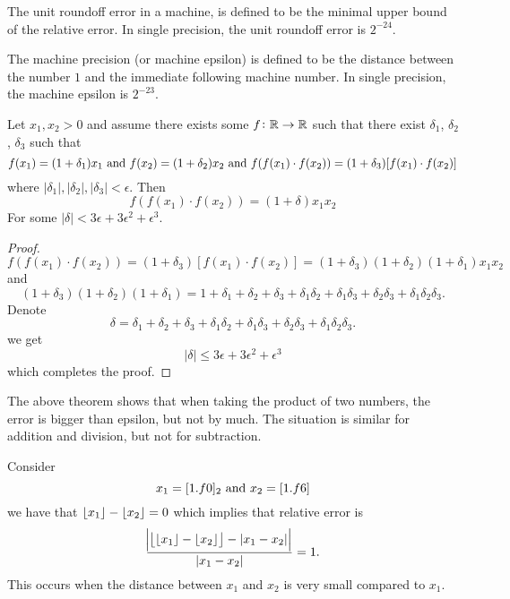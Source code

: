 \documentclass[11pt,a4paper]{article}
\begin{document}
\begin{definition}
  The unit roundoff error in a machine, is defined to be the minimal upper bound
  of the relative error.
  In single precision, the unit roundoff error is $2^{-24}$.
\end{definition}

\begin{definition}
  The machine precision (or machine epsilon) is defined to be the distance
  between the number $1$ and the immediate following machine number.
  In single precision, the machine epsilon is $2^{-23}$.
\end{definition}

\begin{proposition}
  Let $x_1,x_2 > 0$ and assume there exists some $f \colon \mathbb{R} \to \mathbb{R}$ such that
  there exist $\delta_1$, $\delta_2$, $\delta_3$ such that
  \[
    f(x_1) = (1 + \delta_1) x_1 \text{ and }
    f(x_2) = (1 + \delta_2) x_2 \text{ and }
    f(f(x_1) \cdot f(x_2)) = (1 + \delta_3)[f(x_1) \cdot f(x_2)]
  \]
  where $|\delta_1|, |\delta_2|, |\delta_3| < \epsilon$.
  Then
  \[
    f(f(x_1) \cdot f(x_2)) =
    (1 + \delta) x_1 x_2
  \]
  For some $|\delta| < 3 \epsilon + 3 \epsilon^2 + \epsilon^3$.
\end{proposition}
\begin{proof}
  \[
    f(f(x_1) \cdot f(x_2)) =
    (1 + \delta_3)[f(x_1) \cdot f(x_2)] =
    (1 + \delta_3)(1 + \delta_2)(1 + \delta_1) x_1 x_2
  \]
  and
  \[
    (1 + \delta_3)(1 + \delta_2)(1 + \delta_1) =
    1 + \delta_1 + \delta_2 + \delta_3 + 
    \delta_1 \delta_2 + \delta_1 \delta_3 + \delta_2 \delta_3 + 
    \delta_1 \delta_2 \delta_3.
  \]
  Denote
  \[
    \delta =
    \delta_1 + \delta_2 + \delta_3 + 
    \delta_1 \delta_2 + \delta_1 \delta_3 + \delta_2 \delta_3 + 
    \delta_1 \delta_2 \delta_3.
  \]
  we get
  \[
    |\delta| \le 3 \epsilon + 3 \epsilon^2 + \epsilon^3
  \]
  which completes the proof.
\end{proof}

The above theorem shows that when taking the product of two numbers,
the error is bigger than epsilon, but not by much.
The situation is similar for addition and division,
but not for subtraction.

Consider
\[
  x_1 = [1.f0]_2 \text{ and } x_2 = [1.f6]
\]
we have that $\left\lfloor x_1 \right\rfloor - \left\lfloor x_2 \right\rfloor = 0$ which implies that
relative error is
\[
  \frac{\abs{\left\lfloor \left\lfloor x_1 \right\rfloor - \left\lfloor x_2 \right\rfloor \right\rfloor - |x_1 - x_2|}}{|x_1 - x_2|} = 1.
\]
This occurs when the distance between $x_1$ and $x_2$ is very small compared
to $x_1$.
\end{document}
